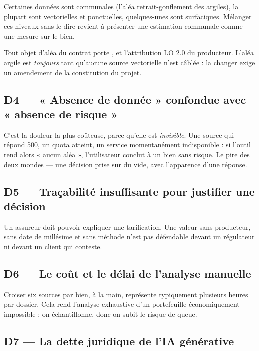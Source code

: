 Certaines données sont communales (l'aléa retrait-gonflement des argiles), la
plupart sont vectorielles et ponctuelles, quelques-unes sont surfaciques. Mélanger
ces niveaux sans le dire revient à présenter une estimation communale comme une
mesure sur le bien.

\begin{invariant}[title={Chaque fait déclare sa finesse}]
Tout objet d'aléa du contrat porte ,  et
l'attribution LO 2.0 du producteur. L'aléa argile est \emph{toujours}
 tant qu'aucune source vectorielle n'est câblée :
la changer exige un amendement de la constitution du projet.
\end{invariant}

\subsection{D4 — « Absence de donnée » confondue avec « absence de risque »}

C'est la douleur la plus coûteuse, parce qu'elle est \emph{invisible}. Une source
qui répond 500, un quota atteint, un service momentanément indisponible : si
l'outil rend alors « aucun aléa », l'utilisateur conclut à un bien sans risque.
Le pire des deux mondes — une décision prise sur du vide, avec l'apparence d'une
réponse.

\subsection{D5 — Traçabilité insuffisante pour justifier une décision}

Un assureur doit pouvoir expliquer une tarification. Une valeur sans producteur,
sans date de millésime et sans méthode n'est pas défendable devant un régulateur
ni devant un client qui conteste.

\subsection{D6 — Le coût et le délai de l'analyse manuelle}

Croiser six sources par bien, à la main, représente typiquement plusieurs heures
par dossier. Cela rend l'analyse exhaustive d'un portefeuille économiquement
impossible : on échantillonne, donc on subit le risque de queue.

\subsection{D7 — La dette juridique de l'IA générative}

